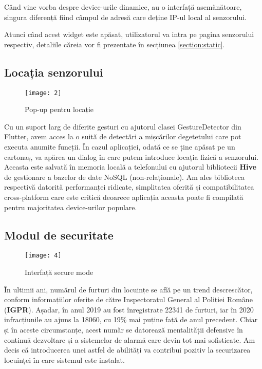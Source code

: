 Când vine vorba despre device-urile dinamice, au o interfață asemănătoare, singura diferență fiind câmpul de adresă care deține IP-ul local al senzorului.

Atunci când acest widget este apăsat, utilizatorul va intra pe pagina senzorului respectiv, detaliile căreia vor fi prezentate în secțiunea \ref{section:static}.
\newpage
\subsection{Locația senzorului}

\begin{wrapfigure}{r}{0.4\textwidth}
	\texttt{[image: 2]}
	\caption{Pop-up pentru locație}
	\label{fig:2}
\end{wrapfigure}
Cu un suport larg de diferite gesturi cu ajutorul clasei GestureDetector din Flutter, avem acces la o suită de detectări a mișcărilor degetetului care pot executa anumite funcții. În cazul aplicației, odată ce se ține apăsat pe un cartonaș, va apărea un dialog în care putem introduce locația fizică a senzorului.
\hfill
Aceasta este salvată în memoria locală a telefonului cu ajutorul bibliotecii \textbf{Hive} de gestionare a bazelor de date NoSQL (non-relaționale). Am ales biblioteca respectivă datorită performanței ridicate, simplitatea oferită și compatibilitatea cross-platform care este critică deoarece aplicația aceasta poate fi compilată pentru majoritatea device-urilor populare. 


\subsection{Modul de securitate} 
\label{section:securitate}

\begin{wrapfigure}{r}{0.4\textwidth}
	\texttt{[image: 4]}
	\caption{Interfață secure mode}
	\label{fig:4}
\end{wrapfigure}

În ultimii ani, numărul de furturi din locuințe se află pe un trend descrescător, conform informațiilor oferite de către Inspectoratul General al Poliției Române (\textbf{IGPR}). Așadar, în anul 2019 au fost înregistrate 22341 de furturi, iar în 2020 infracțiunile au ajuns la 18060, cu 19\% mai puține față de anul precedent. Chiar și în aceste circumstanțe, acest număr se datorează mentalității defensive în continuă dezvoltare și a sistemelor de alarmă care devin tot mai sofisticate. Am decis că introducerea unei astfel de abilități va contribui pozitiv la securizarea locuinței în care sistemul este instalat.

